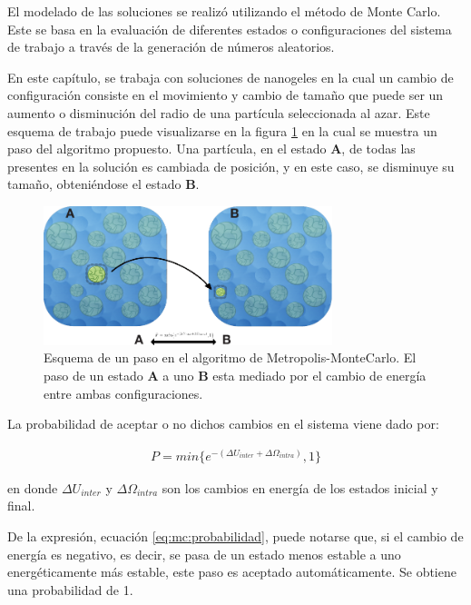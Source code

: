 	El modelado de las soluciones se realiz\'o utilizando el m\'etodo de Monte Carlo. Este se basa en la evaluaci\'on de diferentes estados o configuraciones del sistema de trabajo a trav\'es de la generaci\'on de n\'umeros aleatorios.
	
	En este cap\'itulo, se trabaja con soluciones de nanogeles en la cual un cambio de configuraci\'on consiste en el movimiento y cambio de tama\~no que puede ser un aumento o disminuci\'on  del radio de una part\'icula seleccionada al azar. Este esquema de trabajo puede visualizarse en la figura \ref{fig:mc:pasos_mc} en la cual se muestra un paso del algoritmo propuesto. Una part\'icula, en el estado \textbf{A}, de todas las presentes en la soluci\'on es cambiada de posici\'on, y en este caso, se disminuye su tama\~no, obteni\'endose el estado \textbf{B}.
	
	\begin{figure}[!htb]
		\centering
		\includegraphics[width=0.75\textwidth]{Figures/modelos/mc_model.pdf}
		\caption{Esquema de un paso en el algoritmo de Metropolis-MonteCarlo. El paso de un estado \textbf{A} a uno \textbf{B} esta mediado por el cambio de energ\'ia entre ambas configuraciones. }
		\label{fig:mc:pasos_mc}
	\end{figure}
	
	La probabilidad de aceptar o no dichos cambios en el sistema viene dado por:
	
	\begin{align}
		P = min \{e^{-(\Delta U_{inter} + \Delta \Omega_{intra})},1\}
		\label{eq:mc:probabilidad}
	\end{align}
	
	\noindent en donde $\Delta U_{inter}$ y $\Delta\Omega_{intra}$ son los cambios en energ\'ia de los estados inicial y final. 
	
		De la expresi\'on, ecuaci\'on \ref{eq:mc:probabilidad}, puede notarse que, si el cambio de energ\'ia es negativo, es decir, se pasa de un estado menos estable a uno energ\'eticamente m\'as estable, este paso es aceptado autom\'aticamente. Se obtiene una probabilidad de 1. 
	
